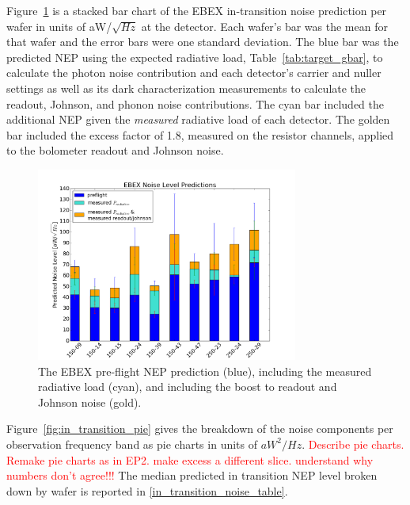 Figure~\ref{fig:prediction_bar_chart} is a stacked bar chart of the \ac{EBEX} in-transition noise prediction per wafer in units of aW/$\sqrt{Hz}$ at the detector. 
Each wafer's bar was the mean for that wafer and the error bars were one standard deviation. 
The blue bar was the predicted \ac{NEP} using the expected radiative load, Table~\ref{tab:target_gbar}, to calculate the photon noise contribution and each detector's carrier and nuller settings as well as its dark characterization measurements to calculate the readout, Johnson, and phonon noise contributions. 
The cyan bar included the additional \ac{NEP} given the \textit{measured} radiative load of each detector. 
The golden bar included the excess factor of 1.8, measured on the resistor channels, applied to the bolometer readout and Johnson noise. 


\begin{figure}[ht!]
\begin{center}
\includegraphics[height=2.5in]{figures/ebex_noise_level_predictions_barchart_per_wafer}
\caption{The \ac{EBEX} pre-flight \ac{NEP} prediction (blue), including the measured radiative load (cyan), and including the boost to readout and Johnson noise (gold).
\label{fig:prediction_bar_chart} }
\end{center}
\end{figure}

Figure~\ref{fig:in_transition_pie} gives the breakdown of the noise components per observation frequency band as pie charts in units of $aW^2/Hz$.
\textcolor{red}{Describe pie charts.}
\textcolor{red}{Remake pie charts as in EP2. make excess a different slice. understand why numbers don't agree!!!}
The median predicted in transition \ac{NEP} level broken down by wafer is reported in \TAB\ref{in_transition_noise_table}. 

